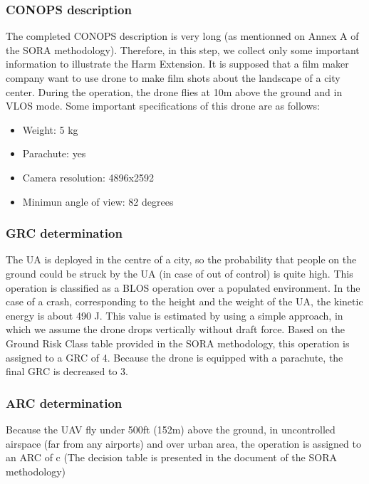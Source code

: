 \documentclass[a4paper, 10, conference]{ieeeconf}  %
\begin{document}
\subsubsection{CONOPS description}
The completed CONOPS description is very long (as mentionned on Annex A of the SORA methodology). Therefore, in this step, we collect only some important information to illustrate the Harm Extension. It is supposed that a film maker company want to use drone to make film shots about the landscape of a city center. During the operation, the drone flies at 10m above the ground and in VLOS mode. Some important specifications of this drone are as follows:
\begin{itemize}
    \item Weight: 5 kg
    \item Parachute: yes
    \item Camera resolution: 4896x2592
    \item Minimun angle of view: 82 degrees 
\end{itemize}

\subsubsection{GRC determination}

The UA is deployed in the centre of a city, so the probability that people on the ground could be struck by the UA (in case of out of control) is quite high. This operation is classified as a BLOS operation over a populated environment. In the case of a crash, corresponding to the height and the weight of the UA, the kinetic energy is about 490 J. This value is estimated by using a simple approach, in which we assume the drone drops vertically without draft force. Based on the Ground Risk Class table provided in the SORA methodology, this operation is assigned to a GRC of 4. Because the drone is equipped with a parachute, the final GRC is decreased to 3.

\subsubsection{ARC determination}

Because the UAV fly under 500ft (152m) above the ground, in uncontrolled airspace (far from any airports) and over urban area, the operation is assigned to an ARC of c (The decision table is presented in the document of  the SORA methodology\cite{SORAV2})
\end{document}
